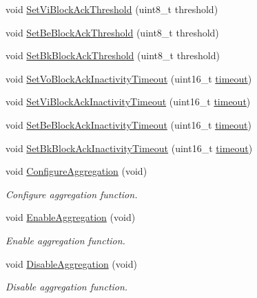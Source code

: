 \begin{DoxyCompactItemize}
\item 
void \hyperlink{classns3_1_1RegularWifiMac_a003eb9b1b39038d0bab3725a18a03895}{Set\+Vi\+Block\+Ack\+Threshold} (uint8\+\_\+t threshold)
\item 
void \hyperlink{classns3_1_1RegularWifiMac_ab026ece3a3a3e3b9b66132d4d91589c1}{Set\+Be\+Block\+Ack\+Threshold} (uint8\+\_\+t threshold)
\item 
void \hyperlink{classns3_1_1RegularWifiMac_a4f57767c82eb4aaced365acda69d8974}{Set\+Bk\+Block\+Ack\+Threshold} (uint8\+\_\+t threshold)
\item 
void \hyperlink{classns3_1_1RegularWifiMac_aeec8938ddaee57cb8c324a210a901774}{Set\+Vo\+Block\+Ack\+Inactivity\+Timeout} (uint16\+\_\+t \hyperlink{openflow-switch_8cc_a386d174ae121d1cfa279074b7e209714}{timeout})
\item 
void \hyperlink{classns3_1_1RegularWifiMac_a479eaca73aac3245cf4107bc45e323ce}{Set\+Vi\+Block\+Ack\+Inactivity\+Timeout} (uint16\+\_\+t \hyperlink{openflow-switch_8cc_a386d174ae121d1cfa279074b7e209714}{timeout})
\item 
void \hyperlink{classns3_1_1RegularWifiMac_a4590e73681af3c4de72c6ec32abdd015}{Set\+Be\+Block\+Ack\+Inactivity\+Timeout} (uint16\+\_\+t \hyperlink{openflow-switch_8cc_a386d174ae121d1cfa279074b7e209714}{timeout})
\item 
void \hyperlink{classns3_1_1RegularWifiMac_a4b4ae1db15dff48d6cf70eb9435677f9}{Set\+Bk\+Block\+Ack\+Inactivity\+Timeout} (uint16\+\_\+t \hyperlink{openflow-switch_8cc_a386d174ae121d1cfa279074b7e209714}{timeout})
\item 
void \hyperlink{classns3_1_1RegularWifiMac_a001b927073ce18a83d1ab6daa6cfe467}{Configure\+Aggregation} (void)
\begin{DoxyCompactList}\small\item\em Configure aggregation function. \end{DoxyCompactList}\item 
void \hyperlink{classns3_1_1RegularWifiMac_aff4c3c6089505d115e0cdb3403cf0eba}{Enable\+Aggregation} (void)
\begin{DoxyCompactList}\small\item\em Enable aggregation function. \end{DoxyCompactList}\item 
void \hyperlink{classns3_1_1RegularWifiMac_ad9a644d5a719919a97489c5c923ed589}{Disable\+Aggregation} (void)
\begin{DoxyCompactList}\small\item\em Disable aggregation function. \end{DoxyCompactList}\end{DoxyCompactItemize}
